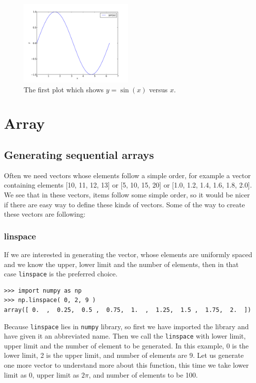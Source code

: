 \documentclass[10pt]{book}
\begin{document}
{\beforefig
\begin{figure}[h!]
  \centering
    \includegraphics[width=0.5\textwidth]{images/1.pdf}
  \caption{The first plot which shows $y = \sin(x)$ versus $x$. }
  \label{fig:1}
\end{figure}
\afterfig

\chapter{Array}
\section{Generating sequential arrays}
Often we need vectors whose elements follow a simple order, for example a vector containing elements [10, 11, 12, 13] or [5, 10, 15, 20] or [1.0, 1.2, 1.4, 1.6, 1.8, 2.0]. We see that in these vectors, items follow some simple order, so it would be nicer if there are easy way to define these kinds of vectors. Some of the way to create these vectors are following: 

\subsection{linspace}
If we are interested in generating the vector, whose elements are uniformly spaced and we know the upper, lower limit and the number of elements, then in that case \verb"linspace" is the preferred choice. 
\beforeverb
\begin{verbatim}
>>> import numpy as np
>>> np.linspace( 0, 2, 9 )       
array([ 0.  ,  0.25,  0.5 ,  0.75,  1.  ,  1.25,  1.5 ,  1.75,  2.  ])
\end{verbatim}
\afterverb
Because \verb"linspace" lies in \verb"numpy" library, so first we have imported the library and have given it an abbreviated name. Then we call the \verb"linspace" with lower limit, upper limit and the number of element to be generated. In this example, 0 is the lower limit, 2 is the upper limit, and number of elements are 9. Let us generate one more vector to understand more about this function, this time we take lower limit as 0, upper limit as $2\pi$, and number of elements to be 100.  

}
\end{document}
